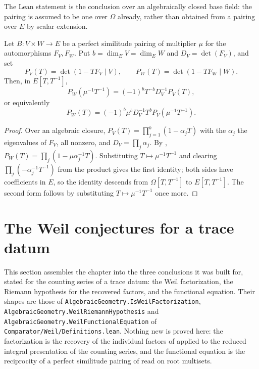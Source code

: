 The Lean statement is the conclusion over an algebraically closed base
field: the pairing is assumed to be one over $\Omega$ already, rather than
obtained from a pairing over $E$ by scalar extension.

\begin{theorem}
\label{thm:zla-degreewise-reciprocal}
\leanok
Let $B:V\times W\to E$ be a perfect similitude pairing of multiplier $\mu$ for
the automorphisms $F_V,F_W$.  Put $b=\dim_EV=\dim_EW$ and
$D_V=\det(F_V)$, and set
\[
  P_V(T)=\det(1-TF_V\mid V),
  \qquad
  P_W(T)=\det(1-TF_W\mid W).
\]
Then, in $E[T,T^{-1}]$,
\[
  P_W(\mu^{-1}T^{-1})=(-1)^bT^{-b}D_V^{-1}P_V(T),
\]
or equivalently
\[
  P_W(T)=(-1)^b\mu^bD_V^{-1}T^bP_V(\mu^{-1}T^{-1}).
\]
\end{theorem}
\begin{proof}
\leanok
Over an algebraic closure, $P_V(T)=\prod_{j=1}^b(1-\alpha_jT)$ with the
$\alpha_j$ the eigenvalues of $F_V$, all nonzero, and
$D_V=\prod_j\alpha_j$.  By
,
$P_W(T)=\prod_j(1-\mu\alpha_j^{-1}T)$.  Substituting $T\mapsto\mu^{-1}T^{-1}$
and clearing $\prod_j(-\alpha_j^{-1}T^{-1})$ from the product gives the first
identity; both sides have coefficients in $E$, so the identity descends from
$\Omega[T,T^{-1}]$ to $E[T,T^{-1}]$.  The second form follows by substituting
$T\mapsto\mu^{-1}T^{-1}$ once more.
\end{proof}

\section{The Weil conjectures for a trace datum}\label{sec:zla-weil-endgame}

This section assembles the chapter into the three conclusions it was built
for, stated for the counting series of a trace datum: the Weil
factorization, the Riemann hypothesis for the recovered factors, and the
functional equation.  Their shapes are those of
\texttt{AlgebraicGeometry.IsWeilFactorization},
\texttt{AlgebraicGeometry.WeilRiemannHypothesis} and
\texttt{AlgebraicGeometry.WeilFunctionalEquation} of
\texttt{Comparator/Weil/Definitions.lean}.  Nothing new is proved here: the
factorization is the recovery of the individual factors of
 applied to the reduced integral presentation of the
counting series, and the functional equation is the reciprocity of a perfect
similitude pairing of  read on root multisets.

